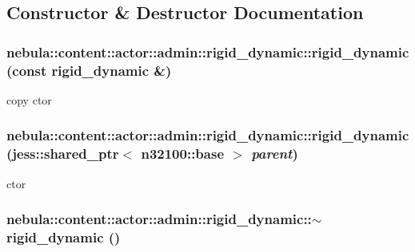 \subsection{Constructor \& Destructor Documentation}
\hypertarget{classnebula_1_1content_1_1actor_1_1admin_1_1rigid__dynamic_abba95050bbb411bf138f825670b9bedf}{
\subsubsection[{rigid\_\-dynamic}]{\setlength{\rightskip}{0pt plus 5cm}nebula::content::actor::admin::rigid\_\-dynamic::rigid\_\-dynamic (const {\bf rigid\_\-dynamic} \&)}}
\label{classnebula_1_1content_1_1actor_1_1admin_1_1rigid__dynamic_abba95050bbb411bf138f825670b9bedf}


copy ctor \hypertarget{classnebula_1_1content_1_1actor_1_1admin_1_1rigid__dynamic_a364eb2411552dfbb57ee49dba81a7aa2}{
\subsubsection[{rigid\_\-dynamic}]{\setlength{\rightskip}{0pt plus 5cm}nebula::content::actor::admin::rigid\_\-dynamic::rigid\_\-dynamic (jess::shared\_\-ptr$<$ {\bf n32100::base} $>$ {\em parent})}}
\label{classnebula_1_1content_1_1actor_1_1admin_1_1rigid__dynamic_a364eb2411552dfbb57ee49dba81a7aa2}


ctor \hypertarget{classnebula_1_1content_1_1actor_1_1admin_1_1rigid__dynamic_a7385f4e3b6028aac11d75a98fcdf89dd}{
\subsubsection[{$\sim$rigid\_\-dynamic}]{\setlength{\rightskip}{0pt plus 5cm}nebula::content::actor::admin::rigid\_\-dynamic::$\sim$rigid\_\-dynamic ()}}
\label{classnebula_1_1content_1_1actor_1_1admin_1_1rigid__dynamic_a7385f4e3b6028aac11d75a98fcdf89dd}



